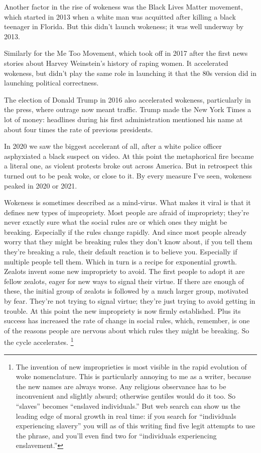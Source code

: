 \documentclass[12pt]{book}
\begin{document}
Another factor in the rise of wokeness was the Black Lives Matter
movement, which started in 2013 when a white man was acquitted after
killing a black teenager in Florida. But this didn't launch wokeness; it
was well underway by 2013.

Similarly for the Me Too Movement, which took off in 2017 after the
first news stories about Harvey Weinstein's history of raping women. It
accelerated wokeness, but didn't play the same role in launching it that
the 80s version did in launching political correctness.

The election of Donald Trump in 2016 also accelerated wokeness,
particularly in the press, where outrage now meant traffic. Trump made
the New York Times a lot of money: headlines during his first
administration mentioned his name at about four times the rate of
previous presidents.

In 2020 we saw the biggest accelerant of all, after a white police
officer asphyxiated a black suspect on video. At this point the
metaphorical fire became a literal one, as violent protests broke out
across America. But in retrospect this turned out to be peak woke, or
close to it. By every measure I've seen, wokeness peaked in 2020 or
2021.

Wokeness is sometimes described as a mind-virus. What makes it viral is
that it defines new types of impropriety. Most people are afraid of
impropriety; they're never exactly sure what the social rules are or
which ones they might be breaking. Especially if the rules change
rapidly. And since most people already worry that they might be breaking
rules they don't know about, if you tell them they're breaking a rule,
their default reaction is to believe you. Especially if multiple people
tell them. Which in turn is a recipe for exponential growth. Zealots
invent some new impropriety to avoid. The first people to adopt it are
fellow zealots, eager for new ways to signal their virtue. If there are
enough of these, the initial group of zealots is followed by a much
larger group, motivated by fear. They're not trying to signal virtue;
they're just trying to avoid getting in trouble. At this point the new
impropriety is now firmly established. Plus its success has increased
the rate of change in social rules, which, remember, is one of the
reasons people are nervous about which rules they might be breaking. So
the cycle accelerates. \footnote{The invention of new improprieties is most visible in the rapid
evolution of woke nomenclature. This is particularly annoying to me as a
writer, because the new names are always worse. Any religious observance
has to be inconvenient and slightly absurd; otherwise gentiles would do
it too. So ``slaves'' becomes ``enslaved individuals.'' But web search
can show us the leading edge of moral growth in real time: if you search
for ``individuals experiencing slavery'' you will as of this writing
find five legit attempts to use the phrase, and you'll even find two for
``individuals experiencing enslavement.''}
\end{document}
